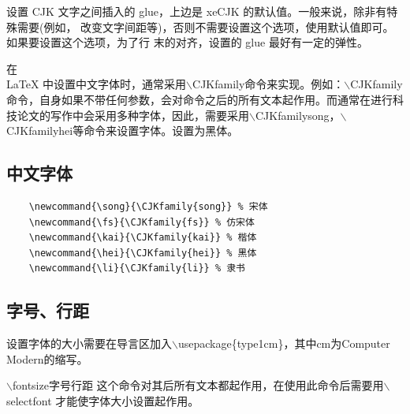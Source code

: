 \documentclass[12pt]{book}
\begin{document}
设置 CJK 文字之间插入的 glue，上边是 xeCJK 的默认值。一般来说，除非有特殊需要(例如， 改变文字间距等)，否则不需要设置这个选项，使用默认值即可。如果要设置这个选项，为了行 末的对齐，设置的 glue 最好有一定的弹性。

在\\LaTeX{}{} 中设置中文字体时，通常采用$\backslash$CJKfamily{}命令来实现。例如：$\backslash$CJKfamily命令，自身如果不带任何参数，会对命令之后的所有文本起作用。而通常在进行科技论文的写作中会采用多种字体，因此，需要采用$\backslash$CJKfamily{song}，$\backslash$CJKfamily{hei}等命令来设置字体。设置为黑体。

\subsection{中文字体}

\begin{verbatim}
    \newcommand{\song}{\CJKfamily{song}} % 宋体
    \newcommand{\fs}{\CJKfamily{fs}} % 仿宋体
    \newcommand{\kai}{\CJKfamily{kai}} % 楷体
    \newcommand{\hei}{\CJKfamily{hei}} % 黑体
    \newcommand{\li}{\CJKfamily{li}} % 隶书
\end{verbatim}

\subsection{字号、行距}

设置字体的大小需要在导言区加入$\backslash$usepackage\{type1cm\}，其中cm为Computer Modern的缩写。

$\backslash$fontsize{字号}{行距}
这个命令对其后所有文本都起作用，在使用此命令后需要用$\backslash$selectfont 才能使字体大小设置起作用。


\begin{table}[htbp]
\end{table}
\end{document}
